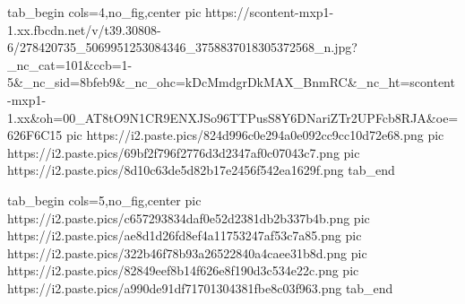  
 
 
 
 

\ifcmt
  tab_begin cols=4,no_fig,center
     pic https://scontent-mxp1-1.xx.fbcdn.net/v/t39.30808-6/278420735_5069951253084346_3758837018305372568_n.jpg?_nc_cat=101&ccb=1-5&_nc_sid=8bfeb9&_nc_ohc=kDcMmdgrDkMAX_BnmRC&_nc_ht=scontent-mxp1-1.xx&oh=00_AT8tO9N1CR9ENXJSo96TTPusS8Y6DNariZTr2UPFcb8RJA&oe=626F6C15
     pic https://i2.paste.pics/824d996c0e294a0e092cc9cc10d72e68.png
     pic https://i2.paste.pics/69bf2f796f2776d3d2347af0c07043c7.png
     pic https://i2.paste.pics/8d10c63de5d82b17e2456f542ea1629f.png
  tab_end
\fi

\ifcmt
  tab_begin cols=5,no_fig,center
     pic https://i2.paste.pics/c657293834daf0e52d2381db2b337b4b.png
     pic https://i2.paste.pics/ae8d1d26fd8ef4a11753247af53c7a85.png
     pic https://i2.paste.pics/322b46f78b93a26522840a4caee31b8d.png
     pic https://i2.paste.pics/82849eef8b14f626e8f190d3c534e22c.png
     pic https://i2.paste.pics/a990de91df71701304381fbe8c03f963.png
  tab_end
\fi
